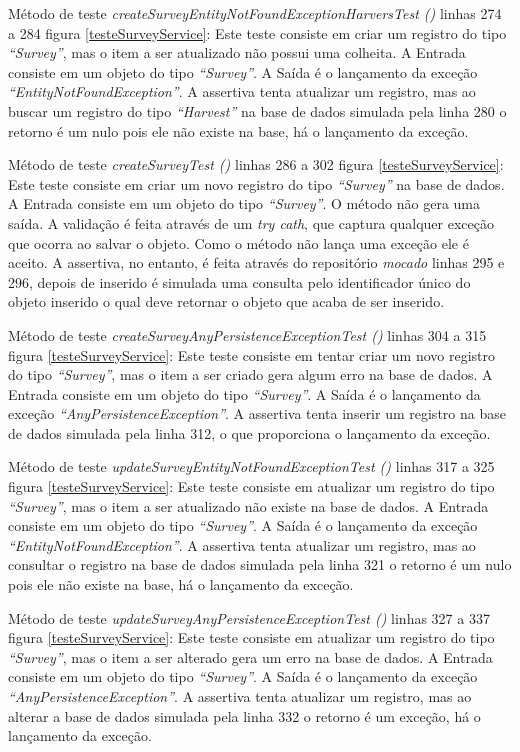Método de teste \textit{ createSurveyEntityNotFoundExceptionHarversTest ()} linhas 274 a 284 figura \ref{testeSurveyService}: Este teste consiste em criar um registro do tipo \textit{“Survey”}, mas o item a ser atualizado não possui uma colheita. A Entrada consiste em um objeto do tipo \textit{“Survey”}. A Saída é o lançamento da exceção \textit{“EntityNotFoundException”}. A assertiva tenta atualizar um registro, mas ao buscar um registro do tipo \textit{“Harvest”} na base de dados simulada pela linha 280 o retorno é um nulo pois ele não existe na base, há o lançamento da exceção.  

Método de teste \textit{ createSurveyTest ()} linhas 286 a 302 figura \ref{testeSurveyService}: Este teste consiste em criar um novo registro do tipo \textit{“Survey”} na base de dados. A Entrada consiste em um objeto do tipo \textit{“Survey”}. O método não gera uma saída. A validação é feita através de um \textit{try cath}, que captura qualquer exceção que ocorra ao salvar o objeto. Como o método não lança uma exceção ele é aceito. A assertiva, no entanto, é feita através do repositório \textit{mocado} linhas 295 e 296, depois de inserido é simulada uma consulta pelo identificador único do objeto inserido o qual deve retornar o objeto que acaba de ser inserido.

Método de teste \textit{ createSurveyAnyPersistenceExceptionTest ()} linhas 304 a 315 figura \ref{testeSurveyService}: Este teste consiste em tentar criar um novo registro do tipo \textit{“Survey”}, mas o item a ser criado gera algum erro na base de dados. A Entrada consiste em um objeto do tipo \textit{“Survey”}. A Saída é o lançamento da exceção \textit{“AnyPersistenceException”}. A assertiva tenta inserir um registro na base de dados simulada pela linha 312, o que proporciona o lançamento da exceção.

Método de teste \textit{ updateSurveyEntityNotFoundExceptionTest ()} linhas 317 a 325 figura \ref{testeSurveyService}: Este teste consiste em atualizar um registro do tipo \textit{“Survey”}, mas o item a ser atualizado não existe na base de dados. A Entrada consiste em um objeto do tipo \textit{“Survey”}. A Saída é o lançamento da exceção \textit{“EntityNotFoundException”}. A assertiva tenta atualizar um registro, mas ao consultar o registro na base de dados simulada pela linha 321 o retorno é um nulo pois ele não existe na base, há o lançamento da exceção.  

Método de teste \textit{ updateSurveyAnyPersistenceExceptionTest ()} linhas 327 a 337 figura \ref{testeSurveyService}: Este teste consiste em atualizar um registro do tipo \textit{“Survey”}, mas o item a ser alterado gera um erro na base de dados. A Entrada consiste em um objeto do tipo \textit{“Survey”}. A Saída é o lançamento da exceção \textit{“AnyPersistenceException”}. A assertiva tenta atualizar um registro, mas ao alterar a base de dados simulada pela linha 332 o retorno é um exceção, há o lançamento da exceção.

